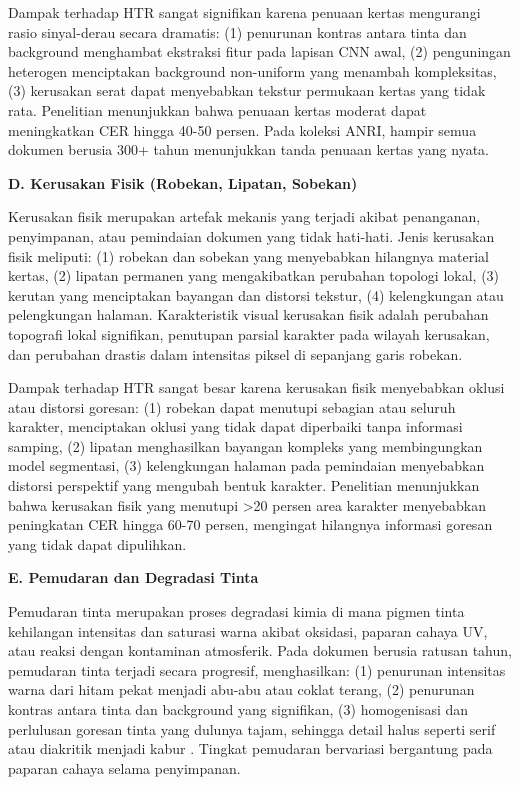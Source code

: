 Dampak terhadap HTR sangat signifikan karena penuaan kertas mengurangi rasio sinyal-derau secara dramatis: (1) penurunan kontras antara tinta dan background menghambat ekstraksi fitur pada lapisan CNN awal, (2) penguningan heterogen menciptakan background non-uniform yang menambah kompleksitas, (3) kerusakan serat dapat menyebabkan tekstur permukaan kertas yang tidak rata. Penelitian \citep{gatos2006} menunjukkan bahwa penuaan kertas moderat dapat meningkatkan CER hingga 40-50 persen. Pada koleksi ANRI, hampir semua dokumen berusia 300+ tahun menunjukkan tanda penuaan kertas yang nyata.

\vspace{0.5ex}
\noindent\textbf{D. Kerusakan Fisik (Robekan, Lipatan, Sobekan)}

Kerusakan fisik merupakan artefak mekanis yang terjadi akibat penanganan, penyimpanan, atau pemindaian dokumen yang tidak hati-hati. Jenis kerusakan fisik meliputi: (1) robekan dan sobekan yang menyebabkan hilangnya material kertas, (2) lipatan permanen yang mengakibatkan perubahan topologi lokal, (3) kerutan yang menciptakan bayangan dan distorsi tekstur, (4) kelengkungan atau pelengkungan halaman. Karakteristik visual kerusakan fisik adalah perubahan topografi lokal signifikan, penutupan parsial karakter pada wilayah kerusakan, dan perubahan drastis dalam intensitas piksel di sepanjang garis robekan.

Dampak terhadap HTR sangat besar karena kerusakan fisik menyebabkan oklusi atau distorsi goresan: (1) robekan dapat menutupi sebagian atau seluruh karakter, menciptakan oklusi yang tidak dapat diperbaiki tanpa informasi samping, (2) lipatan menghasilkan bayangan kompleks yang membingungkan model segmentasi, (3) kelengkungan halaman pada pemindaian menyebabkan distorsi perspektif yang mengubah bentuk karakter. Penelitian menunjukkan bahwa kerusakan fisik yang menutupi >20 persen area karakter menyebabkan peningkatan CER hingga 60-70 persen, mengingat hilangnya informasi goresan yang tidak dapat dipulihkan.

\vspace{0.5ex}
\noindent\textbf{E. Pemudaran dan Degradasi Tinta}

Pemudaran tinta merupakan proses degradasi kimia di mana pigmen tinta kehilangan intensitas dan saturasi warna akibat oksidasi, paparan cahaya UV, atau reaksi dengan kontaminan atmosferik. Pada dokumen berusia ratusan tahun, pemudaran tinta terjadi secara progresif, menghasilkan: (1) penurunan intensitas warna dari hitam pekat menjadi abu-abu atau coklat terang, (2) penurunan kontras antara tinta dan background yang signifikan, (3) homogenisasi dan perlulusan goresan tinta yang dulunya tajam, sehingga detail halus seperti serif atau diakritik menjadi kabur \citep{pratikakis2013}. Tingkat pemudaran bervariasi bergantung pada paparan cahaya selama penyimpanan.


